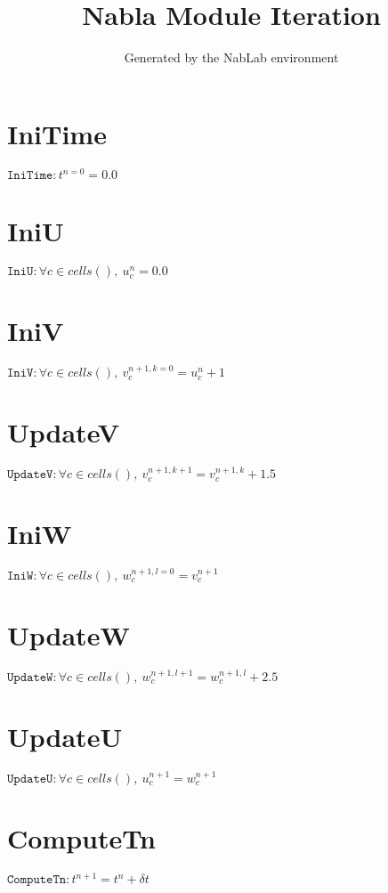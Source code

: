 \documentclass[11pt]{article}
\title{Nabla Module Iteration}
\author{Generated by the NabLab environment}
\begin{document}
\maketitle


\section{IniTime}
$\texttt{IniTime} : t^{n=0} = 0.0$


\section{IniU}
$\texttt{IniU} : \forall{c\in cells()}, \ u^{n}_{c} = 0.0$


\section{IniV}
$\texttt{IniV} : \forall{c\in cells()}, \ v^{n+1, k=0}_{c} = u^{n}_{c} + 1$


\section{UpdateV}
$\texttt{UpdateV} : \forall{c\in cells()}, \ v^{n+1, k+1}_{c} = v^{n+1, k}_{c} + 1.5$


\section{IniW}
$\texttt{IniW} : \forall{c\in cells()}, \ w^{n+1, l=0}_{c} = v^{n+1}_{c}$


\section{UpdateW}
$\texttt{UpdateW} : \forall{c\in cells()}, \ w^{n+1, l+1}_{c} = w^{n+1, l}_{c} + 2.5$


\section{UpdateU}
$\texttt{UpdateU} : \forall{c\in cells()}, \ u^{n+1}_{c} = w^{n+1}_{c}$


\section{ComputeTn}
$\texttt{ComputeTn} : t^{n+1} = t^{n} + \delta t$
\end{document}
